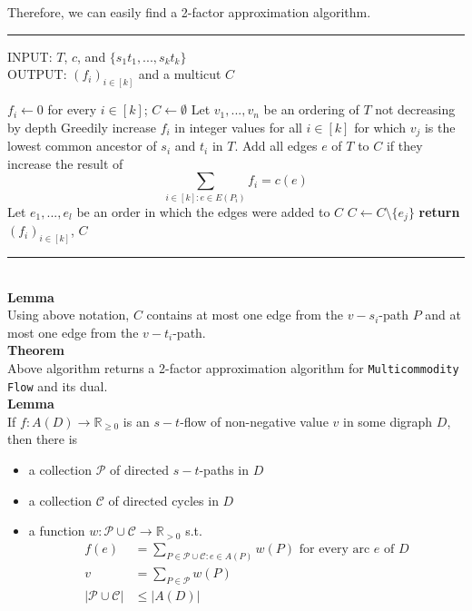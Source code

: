 \documentclass[a4paper, 12pt]{article}
\begin{document}
	Therefore, we can easily find a 2-factor approximation algorithm.\\
	\par\noindent\rule{\textwidth}{0.4pt}
	INPUT: $T$, $c$, and $\{s_1t_1,...,s_kt_k\}$\\
	OUTPUT: $(f_i)_{i\in[k]}$ and a multicut $C$
	\begin{algorithmic}[1]
		\State $f_i \gets 0$ for every $i \in [k]$; $C\gets \emptyset$
		\State Let $v_1,...,v_n$ be an ordering of $T$ not decreasing by depth
		\State Greedily increase $f_i$ in integer values for all $i \in [k]$ for which $v_j$ is the lowest common ancestor of $s_i$ and $t_i$ in $T$. Add all edges $e$ of $T$ to $C$ if they increase the result of \[\sum_{i \in [k]: e \in E(P_i)} f_i = c(e)\]
		\EndFor
		\State Let $e_1,...,e_l$ be an order in which the edges were added to $C$
		\State $C \gets C\setminus \{e_j\}$
		\EndIf
		\EndFor
		\State \textbf{return} $(f_i)_{i \in [k]}$, $C$
	\end{algorithmic}
	\par\noindent\rule{\textwidth}{0.4pt}\\
	\textbf{Lemma}\\
	Using above notation, $C$ contains at most one edge from the $v-s_i$-path $P$ and at most one edge from the $v-t_i$-path.\\
	\textbf{Theorem}\\
	Above algorithm returns a 2-factor approximation algorithm for \texttt{Multicommodity Flow} and its dual.\\
	\textbf{Lemma}\\
	If $f:A(D) \to \mathbb{R}_{\geq 0}$ is an $s-t$-flow of non-negative value $v$ in some digraph $D$, then there is \begin{itemize}
		\item a collection $\mathcal{P}$ of directed $s-t$-paths in $D$
		\item a collection $\mathcal{C}$ of directed cycles in $D$
		\item a function $w:\mathcal{P} \cup \mathcal{C} \to \mathbb{R}_{> 0}$ s.t. \begin{align*}
		f(e) &= \sum_{P \in \mathcal{P}\cup \mathcal{C}: e \in A(P)} w(P) \text{ for every arc $e$ of $D$}\\
		v &= \sum_{P \in \mathcal{P}}w(P)\\
		\left|\mathcal{P} \cup \mathcal{C}\right| &\leq \left|A(D)\right|
		\end{align*}
	\end{itemize}
\end{document}
